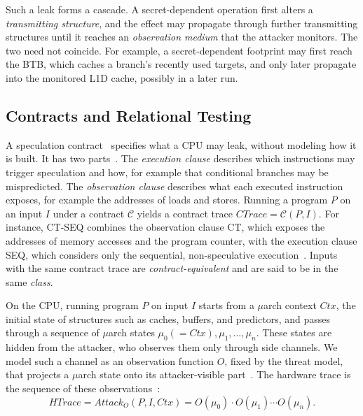 \documentclass[letterpaper,twocolumn,10pt]{article}
\makeatletter
\theoremstyle{definition}
\providecommand{\obs}{\ensuremath{O}}
\providecommand{\At}[1]{\ensuremath{\mathit{Attack}_{#1}}}
\def\uarch@bold#1#2\@nil{\if b#1\boldmath\fi}
\DeclareRobustCommand{\uarch}{{\expandafter\uarch@bold\f@series\@nil\ensuremath{\mu}}arch\xspace}
\makeatother
\begin{document}
Such a leak forms a cascade. A secret-dependent operation first alters a
\emph{transmitting structure}, and the effect may propagate through further transmitting structures
until it reaches an \emph{observation medium} that the attacker monitors. The two need not coincide.
For example, a secret-dependent footprint may first reach the BTB, which caches a branch's
recently used targets, and only later propagate into the monitored L1D cache, possibly in a
later run.

\subsection{Contracts and Relational Testing}
\label{sec:background-contracts}

A speculation contract~\cite{contracts} specifies what a CPU may leak, without modeling how it
is built. It has two parts~\cite{revizor}. The \emph{execution clause} describes which
instructions may trigger speculation and how, for example that conditional branches may be
mispredicted. The \emph{observation clause} describes what each executed instruction exposes,
for example the addresses of loads and stores. Running a program $P$ on an input $I$ under a
contract $\mathcal{C}$ yields a contract trace $\mathit{CTrace}=\mathcal{C}(P,I)$. For instance, \textsc{CT-SEQ} combines the observation clause \textsc{CT}, which exposes the
addresses of memory accesses and the program counter, with the execution clause \textsc{SEQ},
which considers only the sequential, non-speculative execution~\cite{revizor}. Inputs with the same contract trace
are \emph{contract-equivalent} and are said to be in the same \emph{class}.

On the CPU, running program $P$ on input $I$ starts from a \uarch context $\mathit{Ctx}$, the
initial state of structures such as caches, buffers, and predictors, and passes through a
sequence of \uarch states $\mu_0(=\mathit{Ctx}),\mu_1,\dots,\mu_n$. These states are hidden from
the attacker, who observes them only through side channels. We model such a channel as an
observation function $\obs$, fixed by the threat model, that projects a \uarch state onto its
attacker-visible part~\cite{contracts}. The hardware trace
is the sequence of these observations~\cite{revizor}:
\begin{equation}
\mathit{HTrace}=\At{\obs}(P,I,\mathit{Ctx}) =
O(\mu_0)\cdot O(\mu_1)\cdots O(\mu_n).
\label{eq:htrace}
\end{equation}
\end{document}
